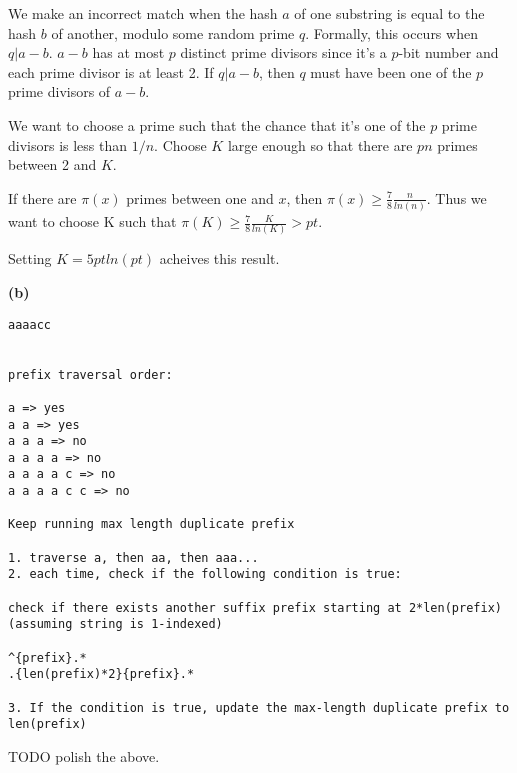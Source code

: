 \documentclass[11pt]{article}
\renewcommand{\part}[1] {\vspace{.10in} {\bf (#1)}}
\begin{document}
We make an incorrect match when the hash $a$ of one substring is equal to the hash $b$ of another, modulo some random prime $q$.
Formally, this occurs when $q | a-b$. $a-b$ has at most $p$ distinct prime divisors since it's a $p$-bit number and each prime divisor is at least 2.
If $q | a-b$, then $q$ must have been one of the $p$ prime divisors of $a-b$.

We want to choose a prime such that the chance that it's one of the $p$ prime divisors is less than $1/n$.
Choose $K$ large enough so that there are $pn$ primes between 2 and $K$.

If there are $\pi(x)$ primes between one and $x$, then $\pi(x) ≥ \frac{7}{8} \frac{n}{ln(n)}$.
Thus we want to choose K such that
$\pi(K) \geq \frac{7}{8} \frac{K}{ln(K)} > pt$.

Setting $K = 5pt ln(pt)$ acheives this result.




\part{b}

\begin{verbatim}
aaaacc


prefix traversal order:

a => yes
a a => yes
a a a => no
a a a a => no
a a a a c => no
a a a a c c => no

Keep running max length duplicate prefix

1. traverse a, then aa, then aaa...
2. each time, check if the following condition is true:

check if there exists another suffix prefix starting at 2*len(prefix) (assuming string is 1-indexed)

^{prefix}.*
.{len(prefix)*2}{prefix}.*

3. If the condition is true, update the max-length duplicate prefix to len(prefix)

\end{verbatim}

TODO polish the above.
\end{document}
